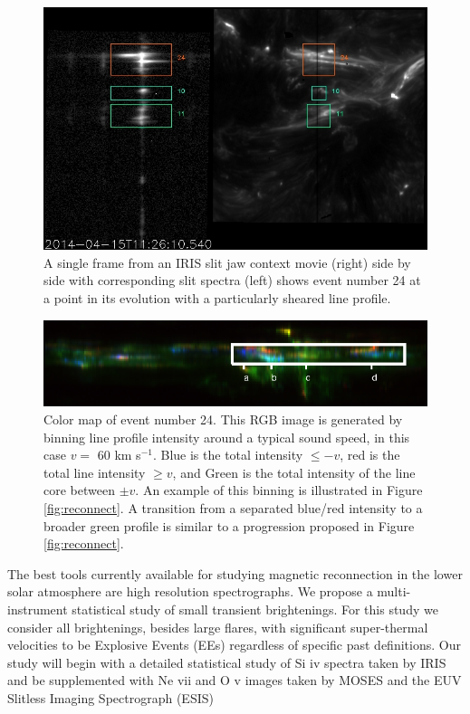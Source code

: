 \documentclass[]{aastex6}
\begin{document}
\begin{figure}
	
	\caption{A single frame from an IRIS slit jaw context movie (right) side by side with corresponding slit spectra (left) shows event number 24 at a point in its evolution with a particularly sheared line profile.}
	\centerline{\includegraphics[scale=.4]{NESSF_img/01481.jpg}}
	\label{fig:eemovie}
\end{figure}

\begin{figure}
	\caption{Color map of event number 24. This RGB image is generated by binning line profile intensity around a typical sound speed, in this case $v = $ 60 km s$^{-1}$.  Blue is the total intensity  $\leq -v$, red is the total line intensity $\geq v$, and Green is the total intensity of the line core between $\pm v$. An example of this binning is illustrated in Figure \ref{fig:reconnect}.  A transition from a separated blue/red intensity to a broader green profile is similar to a progression proposed in Figure \ref{fig:reconnect}.}
	\label{fig:eecolor}
	\centerline{\includegraphics[scale=2]{NESSF_img/ee_color.eps}}
	
\end{figure}

The best tools currently available for studying magnetic reconnection in the lower solar atmosphere are high resolution spectrographs.  We propose a multi-instrument statistical study of small transient brightenings.  For this study we consider all brightenings, besides large flares, with significant super-thermal velocities to be Explosive Events (EEs) regardless of specific past definitions.  Our study will begin with a detailed statistical study of Si {\sc iv} spectra taken by IRIS and be supplemented with Ne {\sc vii} and O {\sc v} images taken by MOSES and the EUV Slitless Imaging Spectrograph (ESIS)
\end{document}
